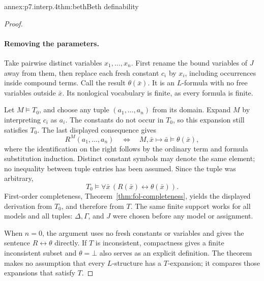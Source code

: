 \begin{annexitem}{annex:p7.interp.4}{thm:beth}{Beth definability}
\begin{proof}
\paragraph{Removing the parameters.}
Take pairwise distinct variables \(x_1,\ldots,x_n\).
First rename the bound variables of \(J\) away from them, then
replace each fresh constant \(c_i\) by \(x_i\), including occurrences
inside compound terms.  Call the result \(\theta(\bar x)\).
It is an \(L\)-formula with no free variables outside \(\bar x\).
Its nonlogical vocabulary is finite, as every formula is finite.

Let \(M\models T_0\), and choose any tuple
\((a_1,\ldots,a_n)\) from its domain.
Expand \(M\) by interpreting \(c_i\) as \(a_i\).
The constants do not occur in \(T_0\), so this expansion still
satisfies \(T_0\).  The last displayed consequence gives
\[
 R^M(a_1,\ldots,a_n)
 \quad\Longleftrightarrow\quad
 M,\bar x\mapsto\bar a\models\theta(\bar x),
\]
where the identification on the right follows by the ordinary
term and formula substitution induction.
Distinct constant symbols may denote the same element; no inequality
between tuple entries has been assumed.
Since the tuple was arbitrary,
\[
 T_0\models\forall\bar x\,
               (R(\bar x)\leftrightarrow\theta(\bar x)).
\]
First-order completeness, Theorem~\ref{thm:fol-completeness}, yields
the displayed derivation from \(T_0\), and therefore from \(T\).
The same finite support works for all models and all tuples:
\(\Delta,\Gamma\), and \(J\) were chosen before any model or assignment.

When \(n=0\), the argument uses no fresh constants or variables and
gives the sentence \(R\leftrightarrow\theta\) directly.
If \(T\) is inconsistent, compactness gives a finite inconsistent
subset and \(\theta=\bot\) also serves as an explicit definition.
The theorem makes no assumption that every \(L\)-structure has a
\(T\)-expansion; it compares those expansions that satisfy \(T\).
\end{proof}
\end{annexitem}
